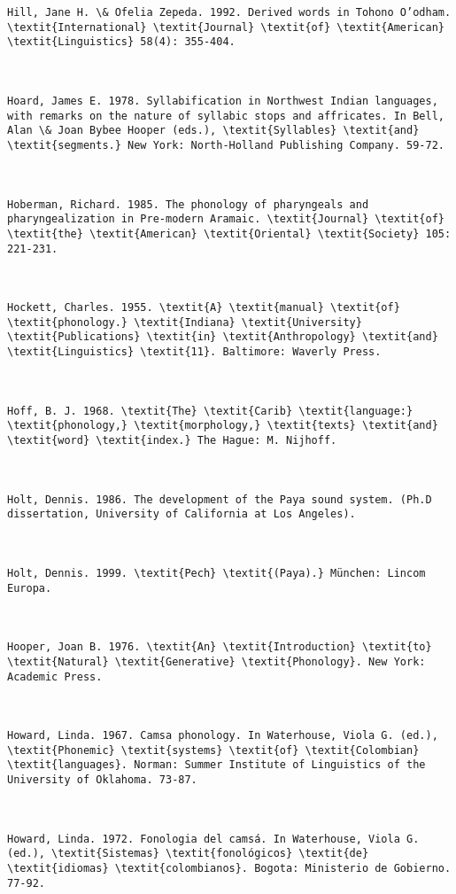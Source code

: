 \begin{verbatim}
Hill, Jane H. \& Ofelia Zepeda. 1992. Derived words in Tohono O’odham. \textit{International} \textit{Journal} \textit{of} \textit{American} \textit{Linguistics} 58(4): 355-404.



Hoard, James E. 1978. Syllabification in Northwest Indian languages, with remarks on the nature of syllabic stops and affricates. In Bell, Alan \& Joan Bybee Hooper (eds.), \textit{Syllables} \textit{and} \textit{segments.} New York: North-Holland Publishing Company. 59-72.



Hoberman, Richard. 1985. The phonology of pharyngeals and pharyngealization in Pre-modern Aramaic. \textit{Journal} \textit{of} \textit{the} \textit{American} \textit{Oriental} \textit{Society} 105: 221-231.



Hockett, Charles. 1955. \textit{A} \textit{manual} \textit{of} \textit{phonology.} \textit{Indiana} \textit{University} \textit{Publications} \textit{in} \textit{Anthropology} \textit{and} \textit{Linguistics} \textit{11}. Baltimore: Waverly Press.



Hoff, B. J. 1968. \textit{The} \textit{Carib} \textit{language:} \textit{phonology,} \textit{morphology,} \textit{texts} \textit{and} \textit{word} \textit{index.} The Hague: M. Nijhoff.



Holt, Dennis. 1986. The development of the Paya sound system. (Ph.D dissertation, University of California at Los Angeles).



Holt, Dennis. 1999. \textit{Pech} \textit{(Paya).} München: Lincom Europa.



Hooper, Joan B. 1976. \textit{An} \textit{Introduction} \textit{to} \textit{Natural} \textit{Generative} \textit{Phonology}. New York: Academic Press.



Howard, Linda. 1967. Camsa phonology. In Waterhouse, Viola G. (ed.), \textit{Phonemic} \textit{systems} \textit{of} \textit{Colombian} \textit{languages}. Norman: Summer Institute of Linguistics of the University of Oklahoma. 73-87.



Howard, Linda. 1972. Fonologia del camsá. In Waterhouse, Viola G. (ed.), \textit{Sistemas} \textit{fonológicos} \textit{de} \textit{idiomas} \textit{colombianos}. Bogota: Ministerio de Gobierno. 77-92.




\end{verbatim}
